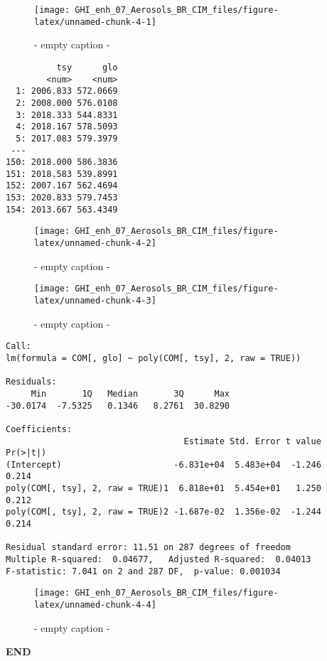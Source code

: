 \documentclass[
  10pt,
  a4paper,oneside]{article}
\begin{document}
\begin{figure}[H]

{\centering \texttt{[image: GHI\_enh\_07\_Aerosols\_BR\_CIM\_files/figure-latex/unnamed-chunk-4-1]} 

}

\caption{ - empty caption - }\label{fig:unnamed-chunk-4-1}
\end{figure}

\begin{verbatim}
          tsy      glo
        <num>    <num>
  1: 2006.833 572.0669
  2: 2008.000 576.0108
  3: 2018.333 544.8331
  4: 2018.167 578.5093
  5: 2017.083 579.3979
 ---                  
150: 2018.000 586.3836
151: 2018.583 539.8991
152: 2007.167 562.4694
153: 2020.833 579.7453
154: 2013.667 563.4349
\end{verbatim}

\begin{figure}[H]

{\centering \texttt{[image: GHI\_enh\_07\_Aerosols\_BR\_CIM\_files/figure-latex/unnamed-chunk-4-2]} 

}

\caption{ - empty caption - }\label{fig:unnamed-chunk-4-2}
\end{figure}
\begin{figure}[H]

{\centering \texttt{[image: GHI\_enh\_07\_Aerosols\_BR\_CIM\_files/figure-latex/unnamed-chunk-4-3]} 

}

\caption{ - empty caption - }\label{fig:unnamed-chunk-4-3}
\end{figure}

\begin{verbatim}
Call:
lm(formula = COM[, glo] ~ poly(COM[, tsy], 2, raw = TRUE))

Residuals:
     Min       1Q   Median       3Q      Max 
-30.0174  -7.5325   0.1346   8.2761  30.8290 

Coefficients:
                                   Estimate Std. Error t value Pr(>|t|)
(Intercept)                      -6.831e+04  5.483e+04  -1.246    0.214
poly(COM[, tsy], 2, raw = TRUE)1  6.818e+01  5.454e+01   1.250    0.212
poly(COM[, tsy], 2, raw = TRUE)2 -1.687e-02  1.356e-02  -1.244    0.214

Residual standard error: 11.51 on 287 degrees of freedom
Multiple R-squared:  0.04677,   Adjusted R-squared:  0.04013 
F-statistic: 7.041 on 2 and 287 DF,  p-value: 0.001034
\end{verbatim}

\begin{figure}[H]

{\centering \texttt{[image: GHI\_enh\_07\_Aerosols\_BR\_CIM\_files/figure-latex/unnamed-chunk-4-4]} 

}

\caption{ - empty caption - }\label{fig:unnamed-chunk-4-4}
\end{figure}

\textbf{END}
\end{document}
